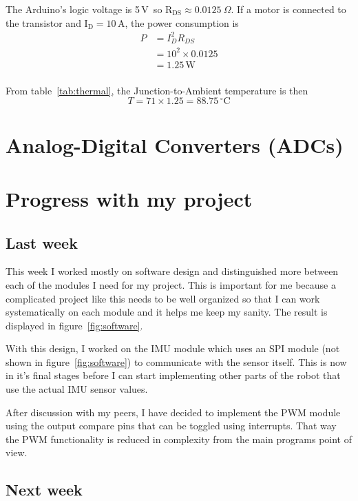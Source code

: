 \documentclass[11pt,a4paper,titlepage]{article}
\newcommand{\W}{\,\textrm{W}}
\newcommand{\A}{\,\textrm{A}}
\newcommand{\V}{\,\textrm{V}}
\newcommand{\degC}{\,^{\circ}\text{C}}
\begin{document}
	\noindent The Arduino's logic voltage is 5\V\ so $\text{R}_{\text{DS}} \approx 0.0125~\Omega$. If a motor is connected to the transistor and $\text{I}_\text{D} = 10\A$, the power consumption is
	\begin{equation}
	\begin{aligned}
		P &= I_D^2R_{DS} \\
		&= 10^2 \times 0.0125\\
		&= 1.25\W\\
	\end{aligned}
	\end{equation} 	
	
	\noindent From table~\ref{tab:thermal}, the Junction-to-Ambient temperature is then
	\[
		T = 71\times 1.25 = 88.75\degC
	\]
	
	
	\section{Analog-Digital Converters (ADCs)}
	
	
	
	\pagebreak
	\section{Progress with my project}
	
	\subsection{Last week}
	This week I worked mostly on software design and distinguished more between each of the modules I need for my project. This is important for me because a complicated project like this needs to be well organized so that I can work systematically on each module and it helps me keep my sanity. The result is displayed in figure~\ref{fig:software}.
	
	With this design, I worked on the IMU module which uses an SPI module (not shown in figure~\ref{fig:software}) to communicate with the sensor itself. This is now in it's final stages before I can start implementing other parts of the robot that use the actual IMU sensor values.
	
	
	
	
	After discussion with my peers, I have decided to implement the PWM module using the output compare pins that can be toggled using interrupts. That way the PWM functionality is reduced in complexity from the main programs point of view.
	
	\pagebreak
	\subsection{Next week}
	
\end{document}
